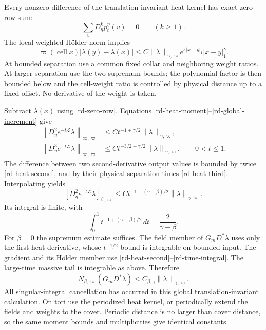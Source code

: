 \documentclass[11pt]{article}
\theoremstyle{remark}
\newcommand{\norm}[1]{\left\|#1\right\|}
\begin{document}
Every nonzero difference of the translation-invariant heat kernel
has exact zero row sum:
\begin{equation}\label{rd-zero-row}
 \sum_vD_\eta^kp_t^\eta(v)=0\qquad(k\ge1).
\end{equation}
The local weighted H\"older norm implies
\begin{equation}\label{rd-global-increment}
 \varpi(\operatorname{cell}x)|\lambda(y)-\lambda(x)|
 \le C\norm{\lambda}_{\gamma,\varpi}
        e^{\kappa|x-y|_1}|x-y|_1^\gamma.
\end{equation}
At bounded separation use a common fixed collar and neighboring
weight ratios. At larger separation use the two supremum bounds;
the polynomial factor is then bounded below and the cell-weight
ratio is controlled by physical distance up to a fixed offset.
No derivative of the weight is taken.

Subtract $\lambda(x)$ using \eqref{rd-zero-row}. Equations
\eqref{rd-heat-moment}--\eqref{rd-global-increment} give
\begin{align}
 \norm{D_\eta^2e^{-t\mathcal L}\lambda}_{\infty,\varpi}
   &\le Ct^{-1+\gamma/2}\norm{\lambda}_{\gamma,\varpi},
       \label{rd-heat-second}\\
 \norm{D_\eta^3e^{-t\mathcal L}\lambda}_{\infty,\varpi}
   &\le Ct^{-3/2+\gamma/2}\norm{\lambda}_{\gamma,\varpi},
                   \qquad0<t\le1.
       \label{rd-heat-third}
\end{align}
The difference between two second-derivative output values is
bounded by twice \eqref{rd-heat-second}, and by their physical
separation times \eqref{rd-heat-third}. Interpolating yields
\begin{equation}\label{rd-heat-holder}
 [D_\eta^2e^{-t\mathcal L}\lambda]_{\beta,\varpi}
       \le Ct^{-1+(\gamma-\beta)/2}
                                  \norm{\lambda}_{\gamma,\varpi}.
\end{equation}
Its integral is finite, with
\begin{equation}\label{rd-time-integral}
 \int_0^1t^{-1+(\gamma-\beta)/2}\,dt
                      =\frac2{\gamma-\beta}.
\end{equation}
For $\beta=0$ the supremum estimate suffices. The field member of
$G_mD^*\lambda$ uses only the first heat derivative, whose
$t^{-1/2}$ bound is integrable on bounded input. The gradient and
its H\"older member use
\eqref{rd-heat-second}--\eqref{rd-time-integral}. The large-time
massive tail is integrable as above. Therefore
\begin{equation}\label{rd-massive-bound}
 N_{\beta,\varpi}(G_mD^*\lambda)
                  \le C_{\beta,\gamma}
                                  \norm{\lambda}_{\gamma,\varpi}.
\end{equation}
All singular-integral cancellation has occurred in this global
translation-invariant calculation. On tori use the periodized heat
kernel, or periodically extend the fields and weights to the cover.
Periodic distance is no larger than cover distance, so the same
moment bounds and multiplicities give identical constants.
\end{document}
